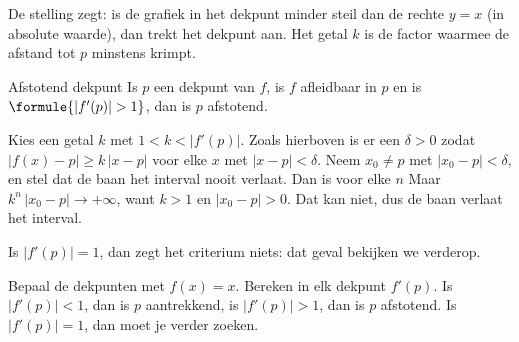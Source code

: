 De stelling zegt: is de grafiek in het dekpunt minder steil dan de rechte $y = x$ (in absolute waarde), dan trekt het dekpunt aan. Het getal $k$ is de factor waarmee de afstand tot $p$ minstens krimpt.

\begin{theorie}
\begin{stelling}{Afstotend dekpunt}
Is $p$ een dekpunt van $f$, is $f$ afleidbaar in $p$ en is $\formule{|f'(p)| > 1}$, dan is $p$ afstotend.
\end{stelling}

\begin{bewijs}
Kies een getal $k$ met $1 < k < |f'(p)|$. Zoals hierboven is er een $\delta > 0$ zodat $|f(x) - p| \geqslant k\,|x - p|$ voor elke $x$ met $|x - p| < \delta$. Neem $x_0 \neq p$ met $|x_0 - p| < \delta$, en stel dat de baan het interval nooit verlaat. Dan is voor elke $n$
Maar $k^n\,|x_0 - p| \to +\infty$, want $k > 1$ en $|x_0 - p| > 0$. Dat kan niet, dus de baan verlaat het interval.
\end{bewijs}
\end{theorie}

Is $|f'(p)| = 1$, dan zegt het criterium niets: dat geval bekijken we verderop.


\begin{werkwijze}
Bepaal de dekpunten met $f(x) = x$. Bereken in elk dekpunt $f'(p)$. Is $|f'(p)| < 1$, dan is $p$ aantrekkend, is $|f'(p)| > 1$, dan is $p$ afstotend. Is $|f'(p)| = 1$, dan moet je verder zoeken.
\end{werkwijze}


